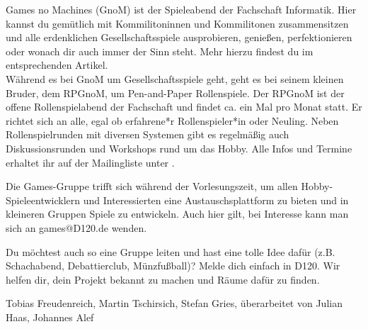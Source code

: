 {Games no Machines (GnoM) ist der Spieleabend der Fachschaft Informatik. Hier kannst du gemütlich mit Kommilitoninnen und Kommilitonen zusammensitzen und alle erdenklichen Gesellschaftsspiele ausprobieren, genießen, perfektionieren oder wonach dir auch immer der Sinn steht. Mehr hierzu findest du im entsprechenden Artikel.\\
Während es bei GnoM um Gesellschaftsspiele geht, geht es bei seinem kleinen Bruder, dem RPGnoM, um Pen-and-Paper Rollenspiele.
Der RPGnoM ist der offene Rollenspielabend der Fachschaft und findet ca. ein Mal pro Monat statt. Er richtet sich an alle, egal ob erfahrene*r Rollenspieler*in oder Neuling. Neben Rollenspielrunden mit diversen Systemen gibt es regelmäßig auch Diskussionsrunden und Workshops rund um das Hobby. Alle Infos und Termine erhaltet ihr auf der Mailingliste unter \footnotemark[12].

Die Games-Gruppe trifft sich während der Vorlesungszeit, um allen Hobby-Spieleentwicklern und Interessierten eine Austauschsplattform zu bieten und in kleineren Gruppen Spiele zu entwickeln. Auch hier gilt, bei Interesse kann man sich an \mbox{games@D120.de} wenden.

Du möchtest auch so eine Gruppe leiten und hast eine tolle Idee dafür (z.B. Schachabend, Debattierclub, Münzfußball)? Melde dich einfach in D120. Wir helfen dir, dein Projekt bekannt zu machen und Räume dafür zu finden.
}
{Tobias Freudenreich, Martin Tschirsich, Stefan Gries,
überarbeitet von Julian Haas, Johannes Alef}


\newpage
